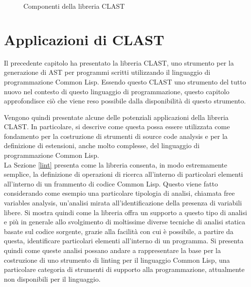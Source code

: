 \documentclass{book}
\newcommand{\image}[4]{
  \begin{figure}[H]
  \makebox[\textwidth][c]{
    \texttt{[image: \#1]}
  }
  \caption{#2}
  \label{#3}
  \end{figure}
}
\begin{document}
\image{img/clast-architecture.png}
      {Componenti della libreria CLAST}
      {fig:clast-architecture}
      {0.5}





\endgroup

\clearpage

\begingroup
\let\clearpage\relax

\chapter{Applicazioni di CLAST}
\label{applications}

Il precedente capitolo ha presentato la libreria CLAST, uno strumento per la
generazione di AST per programmi scritti utilizzando il linguaggio di
programmazione Common Lisp. Essendo questo CLAST uno strumento del tutto nuovo
nel contesto di questo linguaggio di programmazione, questo capitolo
approfondisce ciò che viene reso possibile dalla disponibilità di questo
strumento.

Vengono quindi presentate alcune delle potenziali applicazioni della libreria
CLAST. In particolare, si descrive come questa possa essere utilizzata come
fondamento per la costruzione di strumenti di source code analysis e per la
definizione di estensioni, anche molto complesse, del linguaggio di
programmazione Common Lisp.\\

La Sezione \ref{lint} presenta come la libreria consenta, in modo estremamente
semplice, la definizione di operazioni di ricerca all’interno di particolari
elementi all’interno di un frammento di codice Common Lisp. Questo viene fatto
considerando come esempio una particolare tipologia di analisi, chiamata free
variables analysis, un’analisi mirata all’identificazione della presenza di
variabili libere. Si mostra quindi come la libreria offra un supporto a questo
tipo di analisi e più in generale allo svolgimento di moltissime diverse
tecniche di analisi statica basate sul codice sorgente, grazie alla facilità con
cui è possibile, a partire da questa, identificare particolari elementi
all’interno di un programma. Si presenta quindi come queste analisi possano
andare a rappresentare la base per la costruzione di uno strumento di linting
per il linguaggio Common Lisp, una particolare categoria di strumenti di
supporto alla programmazione, attualmente non disponibili per il linguaggio.\\
\end{document}
